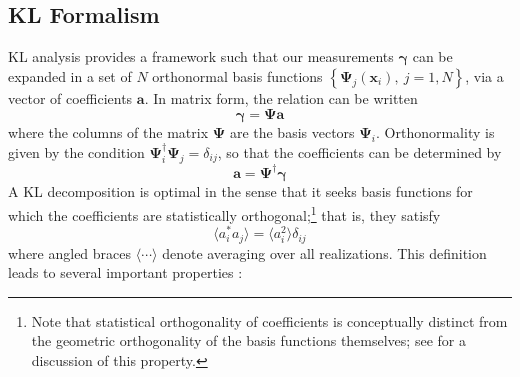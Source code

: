\documentclass[twocolumn]{emulateapj}
\newcommand{\myvec}[1]{\boldsymbol{#1}}
\begin{document}
\subsection{KL Formalism}
\label{KL_Formalism}
KL analysis provides a framework such that our measurements $\myvec\gamma$ 
can be expanded in a set of $N$ orthonormal basis functions 
$\left\{ \myvec{\Psi}_j(\myvec{x}_i),\ j=1,N\right\}$, via a vector of
coefficients $\myvec{a}$.  In matrix form, the relation can be written
\begin{equation}
  \myvec\gamma = \myvec\Psi\myvec{a}
\end{equation}
where the columns of the matrix $\myvec\Psi$ are the basis vectors 
$\myvec\Psi_i$.  Orthonormality is given by the condition 
$\myvec\Psi_i^\dagger\myvec\Psi_j = \delta_{ij}$, so that the coefficients
can be determined by
\begin{equation}
  \myvec{a} = \myvec{\Psi}^\dagger\myvec{\gamma}
\end{equation}
A KL decomposition is optimal in the sense that it seeks basis 
functions for which the 
coefficients are statistically orthogonal;\footnote{Note that statistical
orthogonality of coefficients is conceptually distinct from the 
geometric orthogonality of the basis functions themselves; 
see \citet{Vogeley96} for a discussion of this property.}
that is, they satisfy
\begin{equation}
  \langle a_i^* a_j \rangle = \langle a_i^2 \rangle \delta_{ij}
\end{equation}
where angled braces $\langle\cdots\rangle$ denote averaging over all 
realizations.  This definition leads to several important properties
\citep[see][for a thorough discussion \& derivation]{Vogeley96}:
\end{document}
